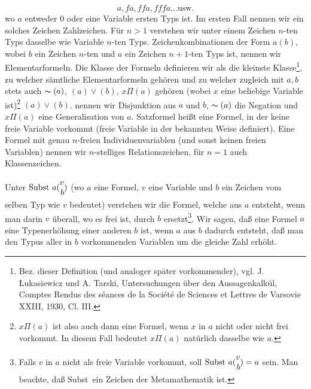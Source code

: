 \documentclass[draft]{scrartcl}
\newcounter{commentaryNumber}
\begin{document}
$$ a, fa, ffa, fffa \dots \text{usw.} $$
wo $a$ entweder 0 oder eine Variable ersten Typs ist.
Im ersten Fall nennen wir ein solches Zeichen Zahlzeichen.
Für $n > 1$ verstehen wir unter einem Zeichen $n$-ten
Typs dasselbe wie Variable $n$-ten Typs. 
Zeichenkombinationen der Form $a\left(b\right)$, wobei
$b$ ein Zeichen $n$-ten und $a$ ein Zeichen $n + 1$-ten 
Typs ist, nennen wir Elementarformeln. Die Klasse der 
Formeln definieren wir als die kleinste
Klasse\footnote{Bez. dieser Definition (und analoger 
später vorkommender), vgl. J. \L{}ukasiewicz und 
A. Tarski, Untersuchungen über den Aussagenkalkül, 
Comptes Rendus des s\'eances de la Soci\'et\'e de 
Sciences et Lettres de Varsovie XXIII, 1930, Cl. III.},
zu welcher sämtliche Elementarformeln gehören und zu
welcher zugleich mit $a, b$ stets auch 
$\thicksim\left(a\right)$, $\left(a\right)\lor\left(b\right)$, $x\Pi\left(a\right)$ gehören (wobei $x$ eine
\let\originalfootnote=\thefootnote
\let\thefootnote=\fnachtzehna
beliebige Variable ist)\footnote{$x\Pi\left(a\right)$ ist also auch dann eine 
Formel, wenn $x$ in $a$ nicht oder nicht frei vorkommt. In diesem 
Fall bedeutet $x\Pi\left(a\right)$ natürlich dasselbe wie $a$.}
\let\thefootnote=\originalfootnote
\setcounter{footnote}{19}
$\left(a\right)\lor\left(b\right)$. nennen wir Disjunktion aus $a$ und $b$, 
$\thicksim\left(a\right)$ die Negation und $x\Pi\left(a\right)$ eine Generalisation von 
$a$. Satzformel heißt eine Formel, in der keine freie Variable 
vorkommt (freie Variable in der bekannten Weise
definiert). Eine Formel mit genau $n$-freien 
Individuenvariablen (und sonst keinen freien Variablen)
nennen wir $n$-stelliges Relationszeichen, für $n = 1$
auch Klassenzeichen.

Unter $\text{Subst\ } a \Spvek{v; b}$ (wo $a$ eine Formel,
$v$ eine Variable und $b$ ein Zeichen vom selben Typ wie 
$v$ bedeutet) verstehen wir die Formel, welche aus $a$ 
entsteht, wenn man darin $v$ überall, wo es frei ist, durch
$b$ ersetzt\footnote{Falls $v$ in $a$ nicht als freie 
Variable vorkommt, soll $\text{Subst\ } a \Spvek{v; b} = a$
sein. Man beachte, daß \glqq Subst\grqq\ ein Zeichen der Metamathematik ist.}.
Wir sagen, daß eine Formel $a$ eine Typenerhöhung einer
anderen $b$ ist, wenn $a$ aus $b$ dadurch entsteht, daß
man den Typus aller in $b$ vorkommenden Variablen um die
gleiche Zahl erhöht.
\end{document}
